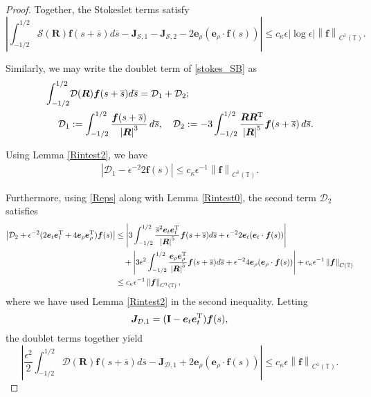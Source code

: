 \documentclass[11pt]{article}
\numberwithin{equation}{section}
\newcommand{\T}{\mathbb{T}}
\newcommand{\D}{\mathcal{D}}
\newcommand{\bars}{\overline s}
\newcommand{\be}{\bm{e}}
\newcommand{\ts}{\thinspace}
\newcommand{\abs}[1]{\left\lvert #1 \right\rvert}
\newcommand{\norm}[1]{\left\lVert #1 \right\rVert}
\newcommand{\mc}[1]{\mathcal{#1}}
\theoremstyle{definition}
\begin{document}
\begin{proof}
Together, the Stokeslet terms satisfy 
\begin{equation}\label{stokeslet_terms}
\abs{\int_{-1/2}^{1/2}\mc{S}(\bm{R})\bm{f}(s+\bars)d\bars - \bm{J}_{\mc{S},1}-\bm{J}_{\mc{S},2}  - 2\be_\rho(\be_{\rho}\cdot\bm{f}(s))} \le c_\kappa\epsilon\abs{\log\epsilon}\norm{\bm{f}}_{C^1(\T)}.
\end{equation}


Similarly, we may write the doublet term of \eqref{stokes_SB} as
\begin{equation}
\begin{aligned}
\int_{-1/2}^{1/2}&\mc{D}(\bm{R})\bm{f}(s+\bars)d\bars = \mc{D}_1 + \mc{D}_2; \\
\mc{D}_1&:= \int_{-1/2}^{1/2} \frac{\bm{f}(s+\bars)}{\abs{\bm{R}}^3} \ts d\bars, \quad \mc{D}_2 := -3\int_{-1/2}^{1/2} \frac{\bm{R}\bm{R}^{\rm T}}{\abs{\bm{R}}^5} \bm{f}(s+\bars) \ts d\bars.
\end{aligned}
\end{equation}

Using Lemma \ref{Rintest2}, we have
\begin{align*}
\abs{\mc{D}_1- \epsilon^{-2}2 \bm{f}(s)} \le c_\kappa \epsilon^{-1}\norm{\bm{f}}_{C^1(\T)}.
\end{align*}

Furthermore, using \eqref{Reps} along with Lemma \ref{Rintest0}, the second term $\D_2$ satisfies 
\begin{align*}
\abs{\mc{D}_2+ \epsilon^{-2}(2\be_t\be_t^{\rm T}+4\be_\rho\be_\rho^{\rm T})\bm{f}(s)} &\le \abs{3\int_{-1/2}^{1/2} \frac{\bars^2\be_t\be_t^{\rm T}}{\abs{\bm{R}}^5} \bm{f}(s+\bars)d\bars + \epsilon^{-2}2\be_t(\be_t\cdot\bm{f}(s))} \\
&\quad +\abs{3\epsilon^2\int_{-1/2}^{1/2} \frac{\be_\rho\be_\rho^{\rm T}}{\abs{\bm{R}}^5} \bm{f}(s+\bars)d\bars + \epsilon^{-2}4\be_\rho(\be_\rho\cdot\bm{f}(s))} + c_\kappa \epsilon^{-1}\norm{\bm{f}}_{C(\T)} \\
&\le  c_\kappa \epsilon^{-1}\norm{\bm{f}}_{C^1(\T)}, 
\end{align*}
where we have used Lemma \ref{Rintest2} in the second inequality. Letting
\begin{equation}\label{cent_int3}
\bm{J}_{\mc{D},1} = ({\bf I}-\be_t\be_t^{\rm T})\bm{f}(s),
\end{equation}
the doublet terms together yield
\begin{equation}\label{doublet_terms}
\abs{\frac{\epsilon^2}{2}\int_{-1/2}^{1/2}\mc{D}(\bm{R})\bm{f}(s+\bars)d\bars -\bm{J}_{\mc{D},1}  + 2\be_\rho(\be_\rho\cdot\bm{f}(s))} \le  c_\kappa \epsilon\norm{\bm{f}}_{C^1(\T)}. 
\end{equation}


\end{proof}
\end{document}
